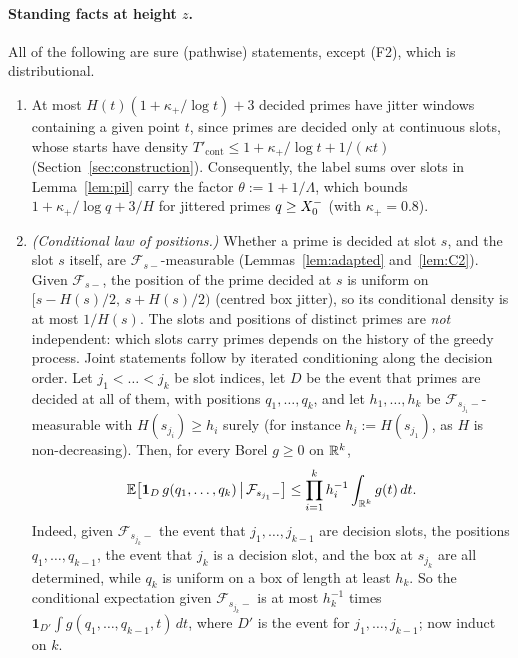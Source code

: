 \paragraph{Standing facts at height $z$.}
All of the following are sure (pathwise) statements, except (F2), which is distributional.
\begin{enumerate}[label=\textup{(F\arabic*)},leftmargin=*]
\item\label{eq:sF1} At most $H(t)(1+\kappa_+/\log t)+3$ decided primes have jitter windows containing a given point $t$, since primes are decided only at continuous slots, whose starts have density
  $T'_{\mathrm{cont}}\le1+\kappa_+/\log t+1/(\kappa t)$ (Section~\ref{sec:construction}). Consequently, the label sums over slots in
  Lemma~\ref{lem:pil} carry the factor $\theta:=1+1/\Lambda$, which bounds $1+\kappa_+/\log q+3/H$ for jittered primes
  $q\ge X_0^{-}$ (with $\kappa_+=0.8$).
\item\label{eq:sF2} \emph{(Conditional law of positions.)} Whether a prime is decided at slot $s$, and the slot $s$ itself,
  are $\mathcal F_{s-}$-measurable (Lemmas~\ref{lem:adapted} and~\ref{lem:C2}). Given $\mathcal F_{s-}$, the position of
  the prime decided at $s$ is uniform on $[s-H(s)/2,\,s+H(s)/2)$ (centred box jitter), so its conditional density is at
  most $1/H(s)$. The slots and positions of distinct primes are \emph{not} independent: which slots carry primes depends on
  the history of the greedy process. Joint statements follow by iterated conditioning along the decision order. Let
  $j_1<\dots<j_k$ be slot indices, let $D$ be the event that primes are decided at all of them, with positions
  $q_1,\dots,q_k$, and let $h_1,\dots,h_k$ be $\mathcal F_{s_{j_1}-}$-measurable with $H(s_{j_i})\ge h_i$ surely (for instance
  $h_i:=H(s_{j_1})$, as $H$ is non-decreasing). Then, for
  every Borel $g\ge0$ on $\mathbb{R}^k$,
  \[
  \mathbb{E}\big[\mathbf 1_D\,g(q_1,\dots,q_k)\,\big|\,\mathcal F_{s_{j_1}-}\big]\le\prod_{i=1}^kh_i^{-1}\int_{\mathbb{R}^k}g(t)\,dt.
  \]
  Indeed, given $\mathcal F_{s_{j_k}-}$ the event that $j_1,\dots,j_{k-1}$ are decision slots, the positions
  $q_1,\dots,q_{k-1}$, the event that $j_k$ is a decision slot, and the box at $s_{j_k}$ are all determined, while $q_k$ is
  uniform on a box of length at least $h_k$. So the conditional expectation given $\mathcal F_{s_{j_k}-}$ is at most
  $h_k^{-1}$ times $\mathbf 1_{D'}\int g(q_1,\dots,q_{k-1},t)\,dt$, where $D'$ is the event for $j_1,\dots,j_{k-1}$; now induct
  on $k$.
\end{enumerate}
